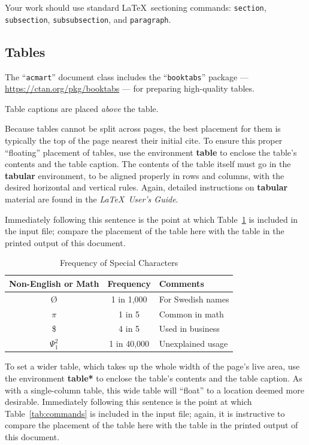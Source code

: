 \documentclass[sigconf]{acmart}
\begin{document}
Your work should use standard \LaTeX\ sectioning commands:
\verb|section|, \verb|subsection|, \verb|subsubsection|, and
\verb|paragraph|. 

\subsection*{Tables}

The ``\verb|acmart|'' document class includes the ``\verb|booktabs|''
package --- \url{https://ctan.org/pkg/booktabs} --- for preparing
high-quality tables.

Table captions are placed {\itshape above} the table.

Because tables cannot be split across pages, the best placement for
them is typically the top of the page nearest their initial cite.  To
ensure this proper ``floating'' placement of tables, use the
environment \textbf{table} to enclose the table's contents and the
table caption.  The contents of the table itself must go in the
\textbf{tabular} environment, to be aligned properly in rows and
columns, with the desired horizontal and vertical rules.  Again,
detailed instructions on \textbf{tabular} material are found in the
\textit{\LaTeX\ User's Guide}.

Immediately following this sentence is the point at which
Table~\ref{tab:freq} is included in the input file; compare the
placement of the table here with the table in the printed output of
this document.

\begin{table}
  \caption{Frequency of Special Characters}
  \label{tab:freq}
  \begin{tabular}{ccl}
    \toprule
    Non-English or Math&Frequency&Comments\\
    \midrule
    \O & 1 in 1,000& For Swedish names\\
    $\pi$ & 1 in 5& Common in math\\
    \$ & 4 in 5 & Used in business\\
    $\Psi^2_1$ & 1 in 40,000& Unexplained usage\\
  \bottomrule
\end{tabular}
\end{table}

To set a wider table, which takes up the whole width of the page's
live area, use the environment \textbf{table*} to enclose the table's
contents and the table caption.  As with a single-column table, this
wide table will ``float'' to a location deemed more
desirable. Immediately following this sentence is the point at which
Table~\ref{tab:commands} is included in the input file; again, it is
instructive to compare the placement of the table here with the table
in the printed output of this document.
\end{document}
